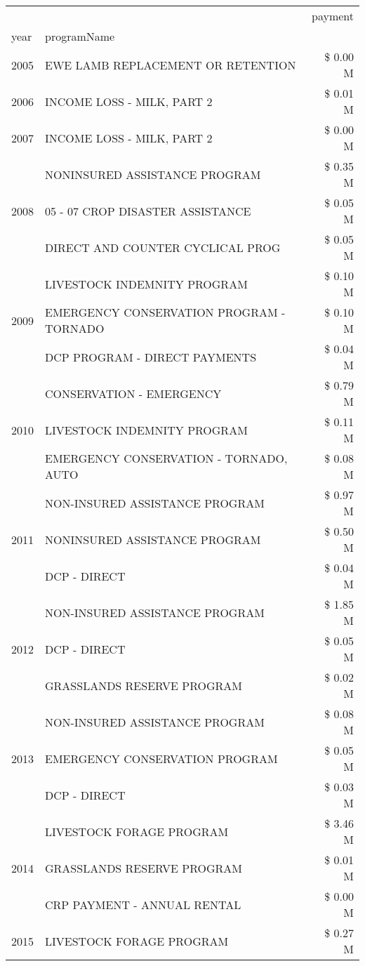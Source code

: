 \begin{tabular}{llr}
\toprule
 &  & payment \\
year & programName &  \\
\midrule
2005 & EWE LAMB REPLACEMENT OR RETENTION & \$ 0.00 M \\
\cline{1-3}
2006 & INCOME LOSS - MILK, PART 2 & \$ 0.01 M \\
\cline{1-3}
2007 & INCOME LOSS - MILK, PART 2 & \$ 0.00 M \\
\cline{1-3}
\multirow[t]{3}{*}{2008} & NONINSURED ASSISTANCE PROGRAM & \$ 0.35 M \\
 & 05 - 07 CROP DISASTER ASSISTANCE & \$ 0.05 M \\
 & DIRECT AND COUNTER CYCLICAL PROG & \$ 0.05 M \\
\cline{1-3}
\multirow[t]{3}{*}{2009} & LIVESTOCK INDEMNITY PROGRAM & \$ 0.10 M \\
 & EMERGENCY CONSERVATION PROGRAM - TORNADO & \$ 0.10 M \\
 & DCP PROGRAM - DIRECT PAYMENTS & \$ 0.04 M \\
\cline{1-3}
\multirow[t]{3}{*}{2010} & CONSERVATION - EMERGENCY & \$ 0.79 M \\
 & LIVESTOCK INDEMNITY PROGRAM & \$ 0.11 M \\
 & EMERGENCY CONSERVATION - TORNADO, AUTO & \$ 0.08 M \\
\cline{1-3}
\multirow[t]{3}{*}{2011} & NON-INSURED ASSISTANCE PROGRAM & \$ 0.97 M \\
 & NONINSURED ASSISTANCE PROGRAM & \$ 0.50 M \\
 & DCP - DIRECT & \$ 0.04 M \\
\cline{1-3}
\multirow[t]{3}{*}{2012} & NON-INSURED ASSISTANCE PROGRAM & \$ 1.85 M \\
 & DCP - DIRECT & \$ 0.05 M \\
 & GRASSLANDS RESERVE PROGRAM & \$ 0.02 M \\
\cline{1-3}
\multirow[t]{3}{*}{2013} & NON-INSURED ASSISTANCE PROGRAM & \$ 0.08 M \\
 & EMERGENCY CONSERVATION PROGRAM & \$ 0.05 M \\
 & DCP - DIRECT & \$ 0.03 M \\
\cline{1-3}
\multirow[t]{3}{*}{2014} & LIVESTOCK FORAGE PROGRAM & \$ 3.46 M \\
 & GRASSLANDS RESERVE PROGRAM & \$ 0.01 M \\
 & CRP PAYMENT - ANNUAL RENTAL & \$ 0.00 M \\
\cline{1-3}
\multirow[t]{3}{*}{2015} & LIVESTOCK FORAGE PROGRAM & \$ 0.27 M \\

\end{tabular}
